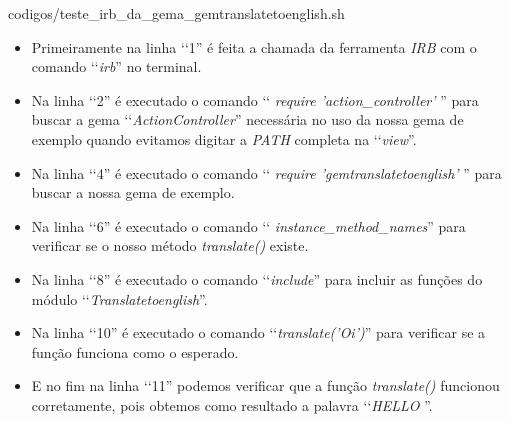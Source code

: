 {codigos/teste_irb_da_gema_gemtranslatetoenglish.sh}

\begin{itemize}

 \item Primeiramente na linha ‘‘1'' é feita a chamada da ferramenta \emph{IRB} com o comando ‘‘\emph{irb}'' 
  no terminal.
  
  \item Na linha ‘‘2'' é executado o comando ‘‘ \emph{require 'action\_controller'} '' para buscar a gema 
  ‘‘\emph{ActionController}'' necessária no uso da nossa gema de exemplo quando evitamos digitar a 
  \emph{PATH} completa na ‘‘\emph{view}''.

  \item Na linha ‘‘4'' é executado o comando ‘‘ \emph{require 'gemtranslatetoenglish'} '' para buscar a 
  nossa gema de exemplo.
  
  \item Na linha ‘‘6'' é executado o comando 
  ‘‘ \emph{instance\_method\_names}'' para verificar se o nosso método \emph{translate()} existe.
  
  \item Na linha ‘‘8'' é executado o comando ‘‘\emph{include}'' para incluir as funções do módulo 
  ‘‘\emph{Translatetoenglish}''.
  
  \item Na linha ‘‘10'' é executado o comando 
  ‘‘\emph{translate('Oi')}'' para verificar se a função funciona como o esperado.
  
  \item E no fim na linha ‘‘11'' podemos verificar que a função \emph{translate()} funcionou corretamente,
  pois obtemos como resultado a palavra ‘‘\emph{HELLO }''.
  
 \end{itemize}

